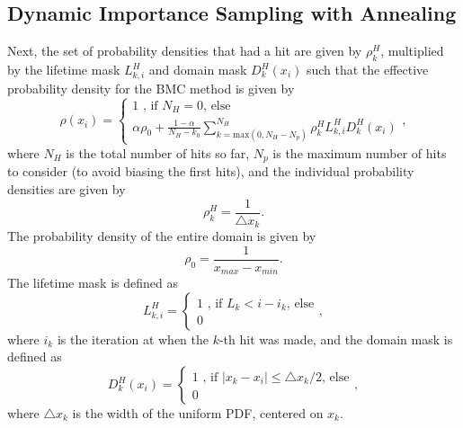 \documentclass{article}
\begin{document}
\subsection{Dynamic Importance Sampling with Annealing}

Next, the set of probability densities that had a hit are given by $\rho_k^H$, multiplied by the lifetime mask $L_{k,i}^H$ and domain mask $D_k^H(x_i)$ such that the effective probability density for the BMC method is given by
\begin{equation}
\rho(x_i) =
\begin{cases}
1 \text{ , if $N_H = 0$, else}\\
\alpha\rho_0 + \frac{1-\alpha}{N_H-k_0}\sum_{k=\text{max}(0, N_H-N_p)}^{N_H}\rho_k^H L_{k,i}^H D_k^H(x_i)
\end{cases},
\end{equation}
where $N_H$ is the total number of hits so far, $N_p$ is the maximum number of hits to consider (to avoid biasing the first hits), and the individual probability densities are given by
\begin{equation}
\rho_k^H = \frac{1}{\triangle x_k}.
\end{equation}
The probability density of the entire domain is given by
\begin{equation}
\rho_0 = \frac{1}{x_{max} - x_{min}}.
\end{equation}
The lifetime mask is defined as
\begin{equation}
L_{k,i}^H =
\begin{cases}
1 \text{ , if $L_k < i - i_k$, else}\\
0
\end{cases},
\end{equation}
where $i_k$ is the iteration at when the $k$-th hit was made, and the domain mask is defined as
\begin{equation}
D_k^H(x_i) =
\begin{cases}
1 \text{ , if $|x_k - x_i| \le \triangle x_k/2$, else}\\
0
\end{cases},
\end{equation}
where $\triangle x_k$ is the width of the uniform PDF, centered on $x_k$.
\end{document}
